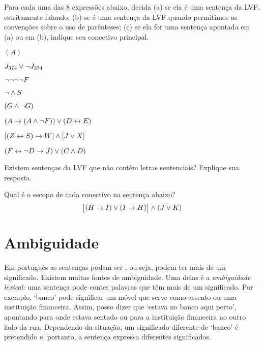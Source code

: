 \solutions
\problempart
\label{pr.wiffTFL}
Para cada uma das $8$ expressões abaixo, decida (a) se ela é uma sentença da LVF, estritamente falando; (b) se é uma sentença da LVF quando permitimos as convenções sobre o uso de parênteses; (c) se ela for uma sentença apontada em (a) ou em (b), indique seu conectivo principal.
\begin{earg}
\item $(A)$
\item $J_{374} \vee \neg J_{374}$
\item $\neg \neg \neg \neg F$
\item $\neg \wedge S$
\item $(G \wedge \neg G)$
\item $(A \rightarrow (A \wedge \neg F)) \vee (D \leftrightarrow E)$
\item $[(Z \leftrightarrow S) \rightarrow W] \wedge [J \vee X]$
\item $(F \leftrightarrow \neg D \rightarrow J) \vee (C \wedge D)$
\end{earg}

\problempart
Existem sentenças da LVF que não contêm letras sentenciais? Explique sua resposta.

\problempart
Qual é o escopo de cada conectivo na sentença abaixo?
$$\bigl[(H \rightarrow I) \vee (I \rightarrow H)\bigr] \wedge (J \vee K)$$

\chapter{Ambiguidade}\label{s:AbmbiguityTFL}

Em português as sentenças podem ser , ou seja, podem ter mais de um significado. Existem muitas fontes de ambiguidade. Uma delas é a \emph{ambiguidade lexical:} uma sentença pode conter palavras que têm mais de um significado. Por exemplo, `banco' pode significar um móvel que serve como assento ou uma instituição financeira. Assim, posso dizer que `estava no banco aqui perto', apontando para onde estava sentado ou para a instituição financeira no outro lado da rua. Dependendo da situação, um significado diferente de `banco' é pretendido e, portanto, a sentença expressa diferentes significados.


